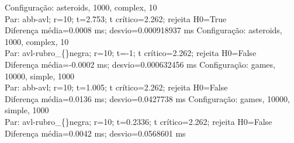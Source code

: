 Configuração: asteroids, 1000, complex, 10\\
Par: abb-avl; r=10; t=2.753; t crítico=2.262; rejeita H0=True\\
Diferença média=0.0008 ms; desvio=0.000918937 ms
Configuração: asteroids, 1000, complex, 10\\
Par: avl-rubro\_\allowbreak\{\}negra; r=10; t=-1; t crítico=2.262; rejeita H0=False\\
Diferença média=-0.0002 ms; desvio=0.000632456 ms
Configuração: games, 10000, simple, 1000\\
Par: abb-avl; r=10; t=1.005; t crítico=2.262; rejeita H0=False\\
Diferença média=0.0136 ms; desvio=0.0427738 ms
Configuração: games, 10000, simple, 1000\\
Par: avl-rubro\_\allowbreak\{\}negra; r=10; t=0.2336; t crítico=2.262; rejeita H0=False\\
Diferença média=0.0042 ms; desvio=0.0568601 ms
